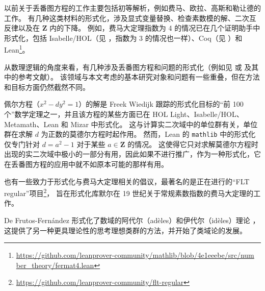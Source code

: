 \documentclass[sigplan,10pt,nonacm,
screen]{acmart} \settopmatter{printfolios=true,printccs=false,printacmref=false}
\newcommand{\ab}[1]{\todo[color=green]{AB: #1}}
\newcommand{\sd}[1]{\todo[color=yellow]{SD: #1}}
\newcommand{\mathlib}{\lstinline{mathlib}\xspace}
\newcommand{\ZZ}{\mathbf{Z}}
\begin{document}
以前关于丢番图方程的工作主要包括初等解析，例如费马、欧拉、高斯和勒让德的工作。
有几种这类材料的形式化，涉及显式变量替换、检查素数模的解、二次互反律以及在 $\ZZ$ 内的下降。
例如，费马大定理指数为 4 的情况已在几个证明助手中形式化，包括 Isabelle/HOL（见 \cite{Oosterhuis}，指数为 3 的情况也一样）、Coq（见 \cite{Diophante-Fermat}）和 Lean\footnote{\href{https://github.com/leanprover-community/mathlib/blob/4e1eeebe/src/number\_theory/fermat4.lean}{https://github.com/leanprover-community/mathlib/blob/4e1eeebe/src/num}\\
\href{https://github.com/leanprover-community/mathlib/blob/4e1eeebe/src/number\_theory/fermat4.lean}{ber\_theory/fermat4.lean}}。

从数理逻辑的角度来看，有几种涉及丢番图方程和问题的形式化（例如见 \cite{larcheywendling_et_al} 或 \cite{pak_et_al} 及其中的参考文献）。
该领域与本文考虑的基本研究对象和问题有一些重叠，但在方法和目标方面仍然截然不同。

佩尔方程（$x^2 -dy^2 =1$）的解是 Freek Wiedijk 跟踪的形式化目标的“前 100 个”数学定理之一，并且该方程的某些方面已在 HOL Light、Isabelle/HOL、Metamath、Lean 和 Mizar 中形式化。
这与计算实二次域中的单位群有关，单位群在求解 $d$ 为正数的莫德尔方程时起作用。
然而，Lean 的 \mathlib 中的形式化仅专门针对 $d = a^ 2 - 1$ 对于某些 $a \in \ZZ$ 的情况。
这使得它只对求解莫德尔方程时出现的实二次域中极小的一部分有用，因此如果不进行推广，作为一种形式化，它在丢番图方程的应用中就不如原本可能的那样有用。

也有一些致力于形式化与费马大定理相关的倡议，最著名的是正在进行的“FLT regular”项目\footnote{\url{https://github.com/leanprover-community/flt-regular}}， %
旨在形式化库默尔在 19 世纪关于常规素数指数的费马大定理的工作。

De Frutos-Fernández 形式化了数域的阿代尔（adèles）和伊代尔（idèles）理论 \cite{de_frutos-fernandez_formalizing_2022}，这提供了另一种更具理论性的思考理想类群的方法，并开始了类域论的发展。
\end{document}
